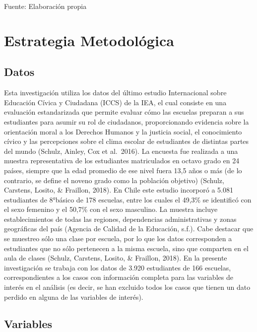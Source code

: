 \documentclass[12pt,twoside]{templates/facsothesis}
\begin{document}
\begin{center}

Fuente: Elaboración propia 

\end{center}

\hypertarget{estrategia-metodoluxf3gica}{%
\chapter{Estrategia Metodológica}\label{estrategia-metodoluxf3gica}}

\hypertarget{datos}{%
\section{Datos}\label{datos}}

Esta investigación utiliza los datos del último estudio Internacional sobre Educación Cívica y Ciudadana (ICCS) de la IEA, el cual consiste en una evaluación estandarizada que permite evaluar cómo las escuelas preparan a sus estudiantes para asumir su rol de ciudadanos, proporcionando evidencia sobre la orientación moral a los Derechos Humanos y la justicia social, el conocimiento cívico y las percepciones sobre el clima escolar de estudiantes de distintas partes del mundo (Schulz, Ainley, Cox et al.~2016). La encuesta fue realizada a una muestra representativa de los estudiantes matriculados en octavo grado en 24 países, siempre que la edad promedio de ese nivel fuera 13,5 años o más (de lo contrario, se define el noveno grado como la población objetivo) (Schulz, Carstens, Losito, \& Fraillon, 2018). En Chile este estudio incorporó a 5.081 estudiantes de 8°básico de 178 escuelas, entre los cuales el 49,3\% se identificó con el sexo femenino y el 50,7\% con el sexo masculino. La muestra incluye establecimientos de todas las regiones, dependencias administrativas y zonas geográficas del país (Agencia de Calidad de la Educación, s.f.). Cabe destacar que se muestreo sólo una clase por escuela, por lo que los datos corresponden a estudiantes que no sólo pertenecen a la misma escuela, sino que comparten en el aula de clases (Schulz, Carstens, Losito, \& Fraillon, 2018). En la presente investigación se trabaja con los datos de 3.920 estudiantes de 166 escuelas, correspondientes a los casos con información completa para las variables de interés en el análisis (es decir, se han excluido todos los casos que tienen un dato perdido en alguna de las variables de interés).

\hypertarget{variables}{%
\section{Variables}\label{variables}}
\end{document}
